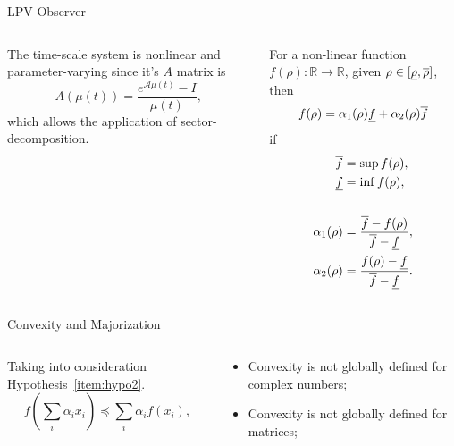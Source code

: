 \begin{slide}{LPV Observer}
  \begin{columns}[c]
    \begin{column}{0.55\textwidth}
      The time-scale system is nonlinear and parameter-varying since it's \(A\)
      matrix is
      \begin{equation}
        A(\mu(t)) = \frac{e^{\mathcal{A}\mu(t)}-I}{\mu(t)},
      \end{equation}
      which allows the application of sector-decomposition.
    \end{column}%
    \hfill%
    \begin{column}{0.55\textwidth}
      For a non-linear function \(f(\rho):\mathbb{R}\rightarrow\mathbb{R}\), given
      \(\rho\in[\underline{\rho}, \overline{\rho}]\), then
      \begin{equation}
        f(\rho) = \alpha_{1}(\rho)\underline{f} + \alpha_{2}(\rho)\overline{f}
      \end{equation}
      if
      \begin{align}
        \overline{f}          & = \sup{f(\rho)},                             \\
        \underline{f}         & = \inf{f(\rho)},                             \\
        \nonumber                                                       \\
        \alpha_{1}(\rho) & = \frac{\overline{f}-f(\rho)}{\overline{f}-\underline{f}},  \\
        \alpha_{2}(\rho) & = \frac{f(\rho)-\underline{f}}{\overline{f}-\underline{f}}.
      \end{align}
    \end{column}%
  \end{columns}
\end{slide}

\begin{slide}{Convexity and Majorization}
  \begin{columns}[c]
    \begin{column}{0.55\textwidth}
      Taking into consideration Hypothesis~\ref{item:hypo2}.
      \begin{equation}
        f(\sum_{i}\alpha_{i}x_{i}) \preceq \sum_{i}\alpha_{i}f(x_{i}),
      \end{equation}
    \end{column}%
    \hfill%
    \begin{column}{0.55\textwidth}
      \begin{itemize}
        \item Convexity is not globally defined for complex numbers;
        \item Convexity is not globally defined for matrices;
      \end{itemize}
    \end{column}%
  \end{columns}
\end{slide}

